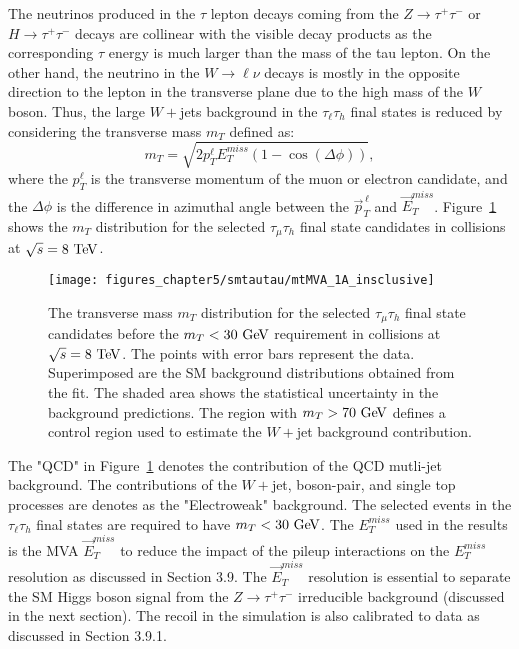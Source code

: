 The neutrinos produced in the $\tau$ lepton decays coming from the $Z\rightarrow\tau^{+}\tau^{-}$ or $H\rightarrow\tau^{+}\tau^{-}$ decays are collinear with the visible decay products as the corresponding $\tau$ energy is much larger than the mass of the tau lepton. On the other hand, the neutrino in the $W\rightarrow\ell\nu$ decays is mostly in the opposite direction to the lepton in the transverse plane due to the high mass of the $W$ boson. Thus, the large $W+$jets background in the $\tau_{\ell}\tau_{h}$ final states is reduced by considering the transverse mass $m_{T}$ defined as:
 \begin{equation} \label{eq:mt}
m_{T} = \sqrt{2p_{T}^{\ell}E_{T}^{miss}(1-\cos(\Delta \phi))},
\end{equation}
where the $p_{T}^{\ell}$ is the transverse momentum of the muon or electron candidate, and the $\Delta \phi$ is the difference in azimuthal angle between the $\vec{p}_{T}^{\,\ell}$ and $\vec{E}_{T}^{miss}$. Figure~\ref{fig:mt} shows the $m_{T}$ distribution for the selected  $\tau_{\mu}\tau_{h}$ final state candidates in collisions at $\sqrt{s}=8~\mathrm{Te\kern -0.1em V}$.
\begin{figure}[htbp]
\centering
\texttt{[image: figures\_chapter5/smtautau/mtMVA\_1A\_insclusive]}
\caption{The transverse mass $m_T$ distribution  for the selected $\tau_{\mu}\tau_{h}$ final state candidates before the $m_{T}<30~\mathrm{Ge\kern -0.1em V}$ requirement in collisions at $\sqrt{s}=8~\mathrm{Te\kern -0.1em V}$. The points with error bars represent the data. Superimposed are the SM background distributions obtained from the fit. The shaded area shows the statistical uncertainty in the background predictions. The region with $m_{T}>70~\mathrm{Ge\kern -0.1em V}$ defines a control region used to estimate the $W+$jet background contribution.}
\label{fig:mt}
\end{figure}
The "QCD" in Figure~\ref{fig:mt} denotes the contribution of the QCD mutli-jet background. The contributions of the $W+$jet, boson-pair, and single top processes are denotes as the "Electroweak" background. The selected events in the $\tau_{\ell}\tau_{h}$ final states are required to have $m_{T}<30~\mathrm{Ge\kern -0.1em V}$.  The $E_{T}^{miss}$ used in the results is the MVA  $\vec{E}_{T}^{miss}$ to reduce the impact of the pileup interactions on the $E_{T}^{miss}$ resolution as discussed in Section 3.9. The $\vec{E}_{T}^{miss}$ resolution is essential to separate the SM Higgs boson signal from the $Z\rightarrow\tau^{+}\tau^{-}$ irreducible background (discussed in the next section). The recoil in the simulation is also calibrated to data as discussed in Section 3.9.1.

